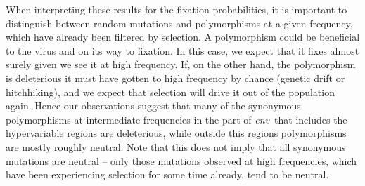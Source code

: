 \documentclass[rmp, twocolumn]{revtex4}
\newcommand{\env}{\textit{env}}
\begin{document}
When interpreting these results for the fixation probabilities, it is important
to distinguish between random mutations and polymorphisms at a given frequency,
which have already been filtered by selection.
A polymorphism could be beneficial to the virus and on its way to fixation. In
this case, we expect that it fixes almost surely given we see it at high
frequency. If, on the other hand, the polymorphism is deleterious it must have
gotten to high frequency by chance (genetic drift or hitchhiking), and
we expect that selection will drive it out of the population again. Hence our
observations suggest that many of the synonymous polymorphisms at intermediate
frequencies in the part of \env~that includes the hypervariable regions are
deleterious, while outside this regions polymorphisms are mostly roughly
neutral. Note that this does not imply that all synonymous mutations are neutral
-- only those mutations observed at high frequencies, which have been
experiencing selection for some time already, tend to be neutral.
\end{document}
